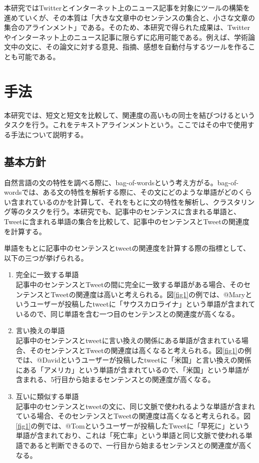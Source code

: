 \documentclass[12pt]{jarticle}
\begin{document}
本研究ではTwitterとインターネット上のニュース記事を対象にツールの構築を進めていくが、その本質は「大きな文章中のセンテンスの集合と、小さな文章の集合のアラインメント」である。そのため、本研究で得られた成果は、Twitterやインターネット上のニュース記事に限らずに応用可能である。例えば、学術論文中の文に、その論文に対する意見、指摘、感想を自動付与するツールを作ることも可能である。

\section{手法}
本研究では、短文と短文を比較して、関連度の高いもの同士を結びつけるというタスクを行う。これをテキストアラインメントという。ここではその中で使用する手法について説明する。

\subsection{基本方針}
自然言語の文の特性を調べる際に、bag-of-words\cite{nlpml}という考え方がる。bag-of-wordsでは、ある文の特性を解析する際に、その文にどのような単語がどのくらい含まれているのかを計算して、それをもとに文の特性を解析し、クラスタリング等のタスクを行う。本研究でも、記事中のセンテンスに含まれる単語と、Tweetに含まれる単語の集合を比較して、記事中のセンテンスとTweetの関連度を計算する。

単語をもとに記事中のセンテンスとtweetの関連度を計算する際の指標として、以下の三つが挙げられる。

\begin{enumerate}
 \item 完全に一致する単語\\
    記事中のセンテンスとTweetの間に完全に一致する単語がある場合、そのセンテンスとTweetの関連度は高いと考えられる。図\ref{fig1}の例では、@Maryというユーザーが投稿したtweetに「サウスカロライナ」という単語が含まれているので、同じ単語を含む一つ目のセンテンスとの関連度が高くなる。
 \item 言い換えの単語\\
    記事中のセンテンスとtweetに言い換えの関係にある単語が含まれている場合、そのセンテンスとTweetの関連度は高くなると考えられる。図\ref{fig1}の例では、@Davidというユーザーが投稿したtweetに「米国」と言い換えの関係にある「アメリカ」という単語が含まれているので、「米国」という単語が含まれる、5行目から始まるセンテンスとの関連度が高くなる。
 \item 互いに類似する単語\\
    記事中のセンテンスとtweetの文に、同じ文脈で使われるような単語が含まれている場合、そのセンテンスとTweetの関連度は高くなると考えられる。図\ref{fig1}の例では、@Tomというユーザーが投稿したTweetに「早死に」という単語が含まれており、これは「死亡率」という単語と同じ文脈で使われる単語であると判断できるので、一行目から始まるセンテンスとの関連度が高くなる。
\end{enumerate}
\end{document}
